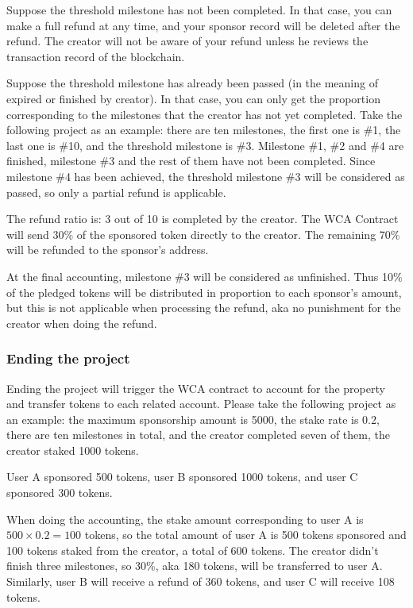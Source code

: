 \documentclass[12pt,a4paper]{article}
\begin{document}
    Suppose the threshold milestone has not been completed.
    In that case, you can make a full refund at any time, and your sponsor record
    will be deleted after the refund.
    The creator will not be aware of your refund unless he reviews the transaction
    record of the blockchain.

    Suppose the threshold milestone has already been passed (in the meaning of
    expired or finished by creator).
    In that case, you can only get the proportion corresponding to the milestones
    that the creator has not yet completed.
    Take the following project as an example: there are ten milestones, the first
    one is \#1, the last one is \#10, and the threshold milestone is \#3.
    Milestone \#1, \#2 and \#4 are finished, milestone \#3 and the rest of them
    have not been completed.
    Since milestone \#4 has been achieved, the threshold milestone \#3 will be
    considered as passed, so only a partial refund is applicable.

    The refund ratio is: 3 out of 10 is completed by the creator.
    The WCA Contract will send 30\% of the sponsored token directly to the creator.
    The remaining 70\% will be refunded to the sponsor's address.

    At the final accounting, milestone \#3 will be considered as unfinished.
    Thus 10\% of the pledged tokens will be distributed in proportion to
    each sponsor's amount, but this is not applicable when processing the refund,
    aka no punishment for the creator when doing the refund.

    \subsubsection{Ending the project}

    Ending the project will trigger the WCA contract to account for the property
    and transfer tokens to each related account.
    Please take the following project as an example: the maximum sponsorship amount
    is 5000, the stake rate is 0.2, there are ten milestones in total, and the
    creator completed seven of them, the creator staked 1000 tokens.

    User A sponsored 500 tokens, user B sponsored 1000 tokens, and user C sponsored
    300 tokens.

    When doing the accounting, the stake amount corresponding to user A is
    $500 \times 0.2 = 100$ tokens, so the total amount of user A is 500 tokens
    sponsored and 100 tokens staked from the creator, a total of 600 tokens.
    The creator didn't finish three milestones, so 30\%, aka 180 tokens, will be
    transferred to user A.
    Similarly, user B will receive a refund of 360 tokens, and user C will receive
    108 tokens.
\end{document}

